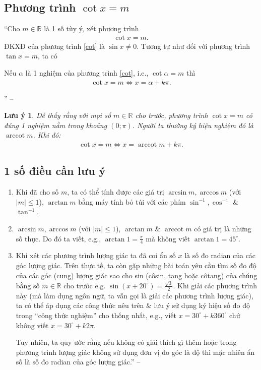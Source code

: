 \documentclass[oneside]{book}
\DeclareMathOperator{\arccot}{arccot}
\numberwithin{equation}{section}
\newtheorem{luuy}{Lưu ý}[section]
\begin{document}
\subsection{Phương trình $\cot x = m$}
``Cho $m\in\mathbb{R}$ là 1 số tùy ý, xét phương trình
\begin{align}
	\label{cot}
	\tag{cot}
	\cot x = m.
\end{align}
ĐKXĐ của phương trình \eqref{cot} là $\sin x\ne 0$. Tương tự như đối với phương trình $\tan x = m$, ta có

\begin{tcolorbox}
	Nếu $\alpha$ là 1 nghiệm của phương trình \eqref{cot}, i.e., $\cot\alpha = m$ thì
	\begin{align}
		\label{root cot}
		\cot x = m\Leftrightarrow x = \alpha + k\pi.
	\end{align}
\end{tcolorbox}
'' -- \cite[pp. 26--27]{SGK_Toan_11_dai_so_giai_tich_nang_cao}

\begin{luuy}
	Dễ thấy rằng với mọi số $m\in\mathbb{R}$ cho trước, phương trình $\cot x = m$ có đúng 1 nghiệm nằm trong khoảng $(0;\pi)$. Người ta thường ký hiệu nghiệm đó là $\arccot m$. Khi đó:
	\begin{align*}
		\boxed{\cot x = m\Leftrightarrow x = \arccot m + k\pi.}
	\end{align*}
\end{luuy}

\subsection{1 số điều cần lưu ý}
\begin{enumerate}
	\item Khi đã cho số $m$, ta có thể tính được các giá trị $\arcsin m,\arccos m$ (với $|m|\le 1$), $\arctan m$ bằng máy tính bỏ túi với các phím $\sin^{-1},\cos^{-1}$ \& $\tan^{-1}$.
	\item $\arcsin m,\arccos m$ (với $|m|\le 1$), $\arctan m$ \& $\arccot m$ có giá trị là những số thực. Do đó ta viết, e.g., $\arctan 1 = \frac{\pi}{4}$ mà không viết $\arctan 1 = 45^\circ$.
	\item Khi xét các phương trình lượng giác ta đã coi ẩn số $x$ là số đo radian của các góc lượng giác. Trên thực tế, ta còn gặp những bài toán yêu cầu tìm số đo độ của các góc (cung) lượng giác sao cho sin (côsin, tang hoặc côtang) của chúng bằng số $m\in\mathbb{R}$ cho trước e.g. $\sin(x + 20^\circ) = \frac{\sqrt{3}}{2}$. Khi giải các phương trình này (mà làm dụng ngôn ngữ, ta vẫn gọi là giải các phương trình lượng giác), ta có thể áp dụng các công thức nêu trên \& lưu ý sử dụng ký hiệu số đo độ trong ``công thức nghiệm'' cho thống nhất, e.g., viết $x = 30^\circ + k360^\circ$ chứ không viết $x = 30^\circ + k2\pi$.
	
	Tuy nhiên, ta quy ước rằng nếu không có giải thích gì thêm hoặc trong phương trình lượng giác không sử dụng đơn vị đo góc là độ thì mặc nhiên ẩn số là số đo radian của góc lượng giác.'' -- \cite[p. 27]{SGK_Toan_11_dai_so_giai_tich_nang_cao}
\end{enumerate}
\end{document}
